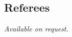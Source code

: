 \documentclass[margin,line]{resume}
\begin{document}
\begin{resume}
    \section{\mysidestyle Referees} 
    {\sl Available on request.}

\end{resume}
\end{document}
